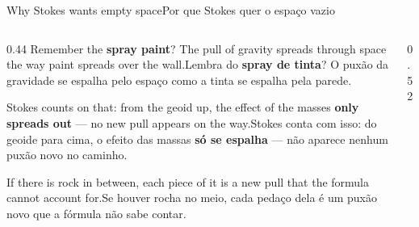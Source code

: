 \documentclass[aspectratio=169,11pt]{beamer}
\newcommand{\tr}[2]{\ifEN#2\else#1\fi}
\newcommand{\bnum}[1]{\textbf{\textcolor{mTeal}{#1}}}
\begin{document}
\begin{frame}{\tr{Por que Stokes quer o espaço vazio}{Why Stokes wants empty space}}
  \begin{columns}[T]
    \begin{column}{0.44\textwidth}
      \tr{Lembra do \bnum{spray de tinta}? O puxão da gravidade se espalha pelo espaço como a
      tinta se espalha pela parede.}{Remember the \bnum{spray paint}? The pull of gravity
      spreads through space the way paint spreads over the wall.}
      \medskip

      \tr{Stokes conta com isso: do geoide para cima, o efeito das massas \bnum{só se espalha}
      --- não aparece nenhum puxão novo no caminho.}{Stokes counts on that: from the geoid up,
      the effect of the masses \bnum{only spreads out} --- no new pull appears on the way.}
      \medskip

      \tr{Se houver rocha no meio, cada pedaço dela é um \alert{puxão novo} que a fórmula não
      sabe contar.}{If there is rock in between, each piece of it is a \alert{new pull} that
      the formula cannot account for.}
    \end{column}
    \begin{column}{0.52\textwidth}
      \centering
    \end{column}
  \end{columns}
\end{frame}
\end{document}
